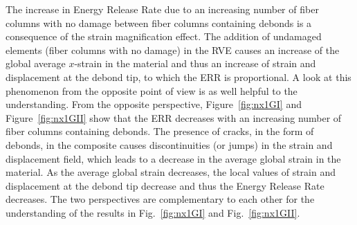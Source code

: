 \documentclass[smallextended]{svjour3}       %
\begin{document}
The increase in Energy Release Rate due to an increasing number of fiber columns with no damage between fiber columns containing debonds is a consequence of the strain magnification effect. The addition of undamaged elements (fiber columns with no damage) in the RVE causes an increase of the global average $x$-strain in the material and thus an increase of strain and displacement at the debond tip, to which the ERR is proportional. A look at this phenomenon from the opposite point of view is as well helpful to the understanding. From the opposite perspective, Figure~\ref{fig:nx1GI} and Figure~\ref{fig:nx1GII} show that the ERR decreases with an increasing number of fiber columns containing debonds. The presence of cracks, in the form of debonds, in the composite causes discontinuities (or jumps) in the strain and displacement field, which leads to a decrease in the average global strain in the material. As the average global strain decreases, the local values of strain and displacement at the debond tip decrease and thus the Energy Release Rate decreases. The two perspectives are complementary to each other for the understanding of the results in Fig.~\ref{fig:nx1GI} and Fig.~\ref{fig:nx1GII}.\\
\end{document}
